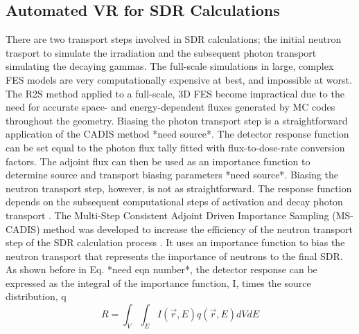 \subsection{Automated VR for SDR Calculations}
There are two transport steps involved in SDR calculations; the initial
neutron trasport to simulate the irradiation and the subsequent photon
transport simulating the decaying gammas.  The full-scale simulations in
large, complex FES models are very computationally expensive at best, and
impossible at worst.
The R2S method applied to a full-scale, 3D FES become impractical due to the
need for accurate space- and energy-dependent fluxes generated by MC codes 
throughout the geometry.  Biasing the photon transport step is a
straightforward application of the CADIS method *need source*.  The detector
response function  can be set equal to the photon flux tally fitted with
flux-to-dose-rate conversion factors.  The adjoint flux can then be used as an
importance function to determine source and transport biasing parameters *need
source*.  Biasing the neutron transport step, however, is not as
straightforward.  The response function depends on the subsequent
computational steps of activation and decay photon transport \cite{Ibrahim_2015}.
The Multi-Step Consistent Adjoint Driven Importance Sampling (MS-CADIS) method
was developed to increase the efficiency of the neutron transport step of the
SDR calculation process \cite{Ibrahim_2015}.  It uses an importance function
to bias the neutron transport that represents the importance of neutrons to
the final SDR.
As shown before in Eq. *need eqn number*, the detector response can be
expressed as the integral of the importance function, I, times the source
distribution, q
\begin{equation} \label{eq:1}
R = \int_{V}\int_{E} 
    I(\overrightarrow{r}, E)
    q(\overrightarrow{r}, E)
    dV dE
\end{equation}
 
